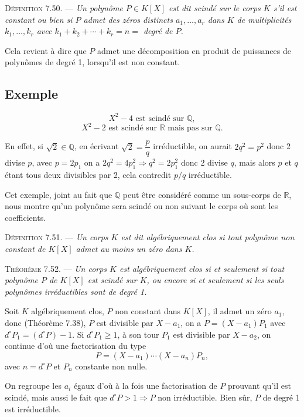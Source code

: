 

\medskip\noindent\textsc{Définition 7.50.} --- \emph{Un polynôme $P\in K[X]$ est dit scindé sur le corps $K$ s'il est constant ou bien si $P$ admet des zéros distincts $a_1,\ldots,a_r$ dans $K$ de multiplicités $k_1,\ldots,k_r$ avec $k_1+k_2+\cdots+k_r=n=$ degré de $P$.}

Cela revient à dire que $P$ admet une décomposition en produit de puissances de polynômes de degré 1, lorsqu'il est non constant.

\subsection*{Exemple}

\[
X^2-4\text{ est scindé sur }\mathbb Q,
\]
\[
X^2-2\text{ est scindé sur }\mathbb R\text{ mais pas sur }\mathbb Q.
\]

En effet, si $\sqrt2\in\mathbb Q$, en écrivant $\sqrt2=\dfrac pq$ irréductible, on aurait $2q^2=p^2$ donc 2 divise $p$, avec $p=2p_1$ on a $2q^2=4p_1^2\Rightarrow q^2=2p_1^2$ donc 2 divise $q$, mais alors $p$ et $q$ étant tous deux divisibles par 2, cela contredit $p/q$ irréductible.

Cet exemple, joint au fait que $\mathbb Q$ peut être considéré comme un sous-corps de $\mathbb R$, nous montre qu'un polynôme sera scindé ou non suivant le corps où sont les coefficients.

\medskip\noindent\textsc{Définition 7.51.} --- \emph{Un corps $K$ est dit algébriquement clos si tout polynôme non constant de $K[X]$ admet au moins un zéro dans $K$.}

\medskip\noindent\textsc{Théorème 7.52.} --- \emph{Un corps $K$ est algébriquement clos si et seulement si tout polynôme $P$ de $K[X]$ est scindé sur $K$, ou encore si et seulement si les seuls polynômes irréductibles sont de degré 1.}

Soit $K$ algébriquement clos, $P$ non constant dans $K[X]$, il admet un zéro $a_1$, donc (Théorème 7.38), $P$ est divisible par $X-a_1$, on a $P=(X-a_1)P_1$ avec $d^\circ P_1=(d^\circ P)-1$. Si $d^\circ P_1\ge1$, à son tour $P_1$ est divisible par $X-a_2$, on continue d'où une factorisation du type
\[
P=(X-a_1)\cdots(X-a_n)P_n,
\]
avec $n=d^\circ P$ et $P_n$ constante non nulle.

On regroupe les $a_i$ égaux d'où à la fois une factorisation de $P$ prouvant qu'il est scindé, mais aussi le fait que $d^\circ P>1\Rightarrow P$ non irréductible. Bien sûr, $P$ de degré 1 est irréductible.

